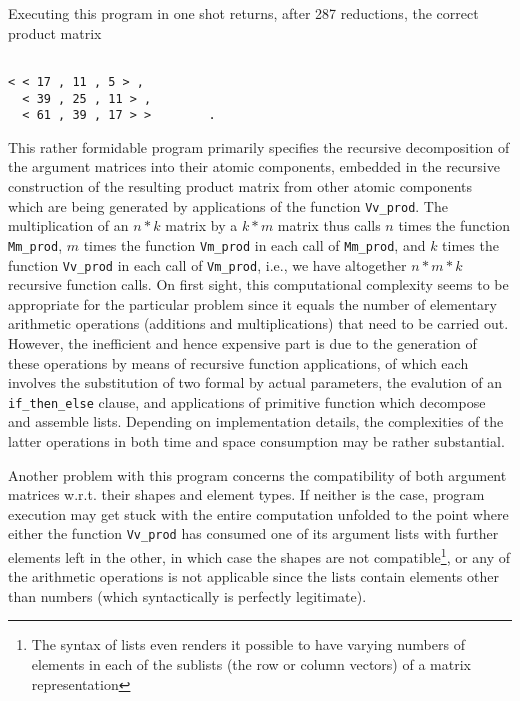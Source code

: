 Executing this program in one shot returns, after 287 reductions,
the correct product matrix
\begin{verbatim}

< < 17 , 11 , 5 > ,
  < 39 , 25 , 11 > ,
  < 61 , 39 , 17 > >        .

\end{verbatim}
This rather formidable program primarily specifies the recursive decomposition of the argument matrices into their atomic components,
embedded in the recursive construction of the resulting product
matrix from other atomic components which are being generated
by applications of the function {\tt Vv\_prod}. The multiplication
of an $n*k$ matrix by a $k*m$ matrix thus calls $n$ times the
function {\tt Mm\_prod}, $m$ times the function {\tt Vm\_prod}
in each call of {\tt Mm\_prod}, and $k$ times the function
{\tt Vv\_prod} in each call of {\tt Vm\_prod}, i.e., we have
altogether $n*m*k$ recursive function calls. On first sight, this
computational complexity seems to be appropriate for the
 particular problem since it equals the number of elementary arithmetic
operations (additions and multiplications) that need to be carried out. However, the inefficient and hence expensive part is due to the generation of these operations by means of recursive function
applications, of which each involves the substitution of two
formal by actual parameters, the evalution of an
 {\tt if\_then\_else}
clause, and applications of primitive function which decompose and
assemble lists. Depending on implementation details, the complexities of the latter operations in both time and space consumption 
may be rather substantial.

Another problem with this program concerns the {\mys compatibility}
of both argument matrices w.r.t. their {\mys shapes} and {\mys element types}.
If neither is the case, program execution may get stuck with
the entire computation unfolded to the point where either the
function {\tt Vv\_prod} has consumed one of its argument lists
with further elements left in the other, in which case the shapes
are not compatible\footnote{The syntax of lists even renders it
possible to have varying numbers of elements in each of the
sublists (the row or column vectors) of a matrix
 representation}, or any of the arithmetic operations is not
applicable since the lists contain elements other than numbers
 (which syntactically is perfectly legitimate).

